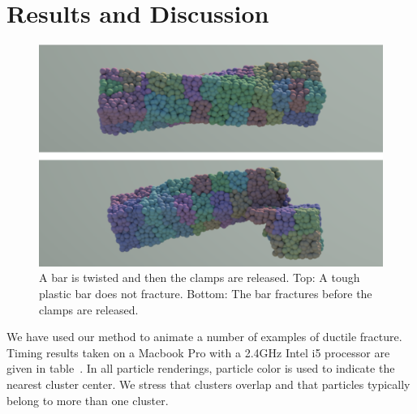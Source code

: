 \documentclass[conference]{acmsiggraph}
\begin{document}
\section{Results and Discussion}
\begin{figure}
\includegraphics[width=\linewidth]{Figures/twistingBarFinal.pdf}
\caption{A bar is twisted and then the clamps are released.  Top: A tough plastic bar does not fracture.  Bottom: The bar fractures before the clamps are released.}
\label{fig:twistedbar}
\end{figure}

We have used our method to animate a number of examples of ductile fracture.  Timing results
taken on a Macbook Pro with a 2.4GHz Intel i5 processor
are given in table~.
In all particle renderings, particle color is used to indicate the nearest cluster center.  
We stress that clusters overlap and that particles typically belong to more than one cluster.
\end{document}
